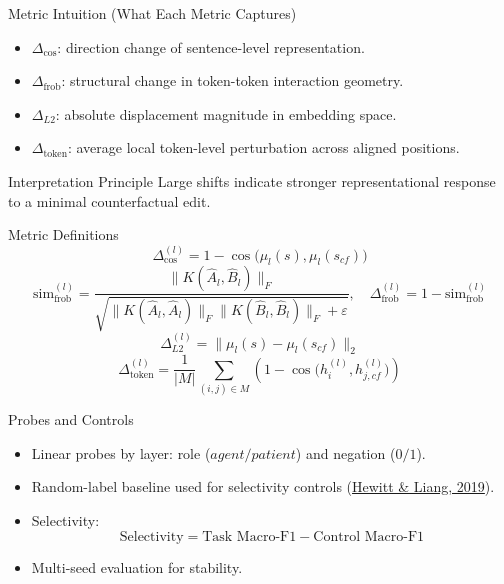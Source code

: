 \documentclass[aspectratio=169,11pt]{beamer}
\begin{document}
\begin{frame}{Metric Intuition (What Each Metric Captures)}
\begin{itemize}
  \item \(\Delta_{\cos}\): direction change of sentence-level representation.
  \item \(\Delta_{\text{frob}}\): structural change in token-token interaction geometry.
  \item \(\Delta_{L2}\): absolute displacement magnitude in embedding space.
  \item \(\Delta_{\text{token}}\): average local token-level perturbation across aligned positions.
\end{itemize}
\vspace{0.3em}
\begin{block}{Interpretation Principle}
Large shifts indicate stronger representational response to a minimal counterfactual edit.
\end{block}
\end{frame}

\begin{frame}{Metric Definitions}
\small
\[
\Delta_{\cos}^{(l)} = 1 - \cos\!\big(\mu_l(s),\mu_l(s_{cf})\big)
\]
\[
\text{sim}_{\text{frob}}^{(l)} =
\frac{\lVert K(\widehat{A}_l,\widehat{B}_l)\rVert_F}
{\sqrt{\lVert K(\widehat{A}_l,\widehat{A}_l)\rVert_F\lVert K(\widehat{B}_l,\widehat{B}_l)\rVert_F + \varepsilon}}
,\quad
\Delta_{\text{frob}}^{(l)} = 1 - \text{sim}_{\text{frob}}^{(l)}
\]
\[
\Delta_{L2}^{(l)} = \lVert \mu_l(s)-\mu_l(s_{cf}) \rVert_2
\]
\[
\Delta_{\text{token}}^{(l)} =
\frac{1}{|M|}\sum_{(i,j)\in M}\left(1-\cos\!\big(h^{(l)}_{i},h^{(l)}_{j,cf}\big)\right)
\]
\normalsize
\end{frame}

\begin{frame}{Probes and Controls}
\begin{itemize}
  \item Linear probes by layer:
  role (\(agent/patient\)) and negation (\(0/1\)).
  \item Random-label baseline used for selectivity controls
  (\href{https://aclanthology.org/D19-1275/}{Hewitt \& Liang, 2019}).
  \item Selectivity:
  \[
  \text{Selectivity} = \text{Task Macro-F1} - \text{Control Macro-F1}
  \]
  \item Multi-seed evaluation for stability.
\end{itemize}
\end{frame}
\end{document}
